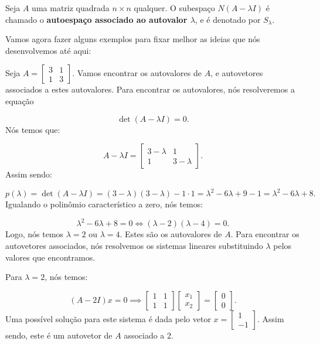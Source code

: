 \begin{Definition}[Autoespaço]
	Seja $A$ uma matriz quadrada $n\times n$ qualquer. O subespaço $N(A - \lambda I)$ é chamado o \textbf{autoespaço associado ao autovalor $\lambda$}, e é denotado por $S_{\lambda}$.
\end{Definition}

Vamos agora fazer alguns exemplos para fixar melhor as ideias que nós desenvolvemos até aqui:

\begin{Example}
	Seja $A = \begin{bmatrix}
		3 & 1 \\
		1 & 3
	\end{bmatrix}$. Vamos encontrar os autovalores de $A$, e autovetores associados a estes autovalores. Para encontrar os autovalores, nós resolveremos a equação
	
	$$
	\det(A - \lambda I) = 0.
	$$
	Nós temos que:
	
	$$
	A - \lambda I = \begin{bmatrix}
		3 - \lambda & 1 \\
		1 & 3 - \lambda
	\end{bmatrix}.
	$$
	Assim sendo:
	
	$$
	p(\lambda) = \det(A - \lambda I) = (3 - \lambda)(3 - \lambda) - 1\cdot 1 = \lambda^2 - 6\lambda + 9 - 1 = \lambda^2 - 6\lambda + 8.
	$$
	Igualando o polinômio característico a zero, nós temos:
	
	$$
	\lambda^2 - 6\lambda + 8 = 0 \iff (\lambda - 2)(\lambda - 4) = 0.
	$$
	Logo, nós temos $\lambda = 2$ ou $\lambda = 4$. Estes são os autovalores de $A$. Para encontrar os autovetores associados, nós resolvemos os sistemas lineares substituindo $\lambda$ pelos valores que encontramos.
	
	Para $\lambda = 2$, nós temos:
	
	$$
	(A - 2I)x = 0 \implies \begin{bmatrix}
		1 & 1 \\
		1 & 1
	\end{bmatrix}\begin{bmatrix}
		x_1 \\
		x_2
	\end{bmatrix} = \begin{bmatrix}
		0 \\
		0
	\end{bmatrix}.
	$$
	Uma possível solução para este sistema é dada pelo vetor $x = \begin{bmatrix}
		1 \\
		-1
	\end{bmatrix}$. Assim sendo, este é um autovetor de $A$ associado a $2$.
	

\end{Example}
